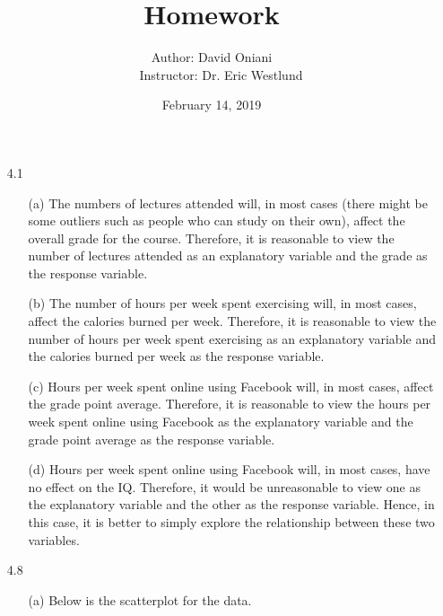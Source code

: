 \documentclass[11pt, a4paper]{article}
\title{\bf{Homework \textnumero 4}}
\author{Author: David Oniani
\\
\ \ \ Instructor: Dr. Eric Westlund}
\date{February 14, 2019}
\begin{document}
\maketitle

\begin{itemize}
\item[4.1]
\begin{itemize}
\item[(a)]
The numbers of lectures attended will, in most cases (there might
be some outliers such as people who can study on their own), affect
the overall grade for the course. Therefore, it is reasonable
to view the number of lectures attended as an explanatory
variable and the grade as the response variable.

\item[]

\item[(b)]
The number of hours per week spent exercising will, in most cases,
affect the calories burned per week. Therefore, it is reasonable
to view the number of hours per week spent exercising as an
explanatory variable and the calories burned per week as the
response variable.

\item[]

\item[(c)]
Hours per week spent online using Facebook will, in most cases,
affect the grade point average. Therefore, it is reasonable
to view the hours per week spent online using Facebook
as the explanatory variable and the grade point average
as the response variable.

\item[]

\item[(d)]
Hours per week spent online using Facebook will, in most cases,
have no effect on the IQ. Therefore, it would be unreasonable
to view one as the explanatory variable and the other
as the response variable. Hence, in this case, it is better
to simply explore the relationship between these two variables.
\end{itemize}

\item[]
\item[]

\item[4.8]
\begin{itemize}
\item[(a)]
Below is the scatterplot for the data.


\end{itemize}
\end{itemize}
\end{document}
